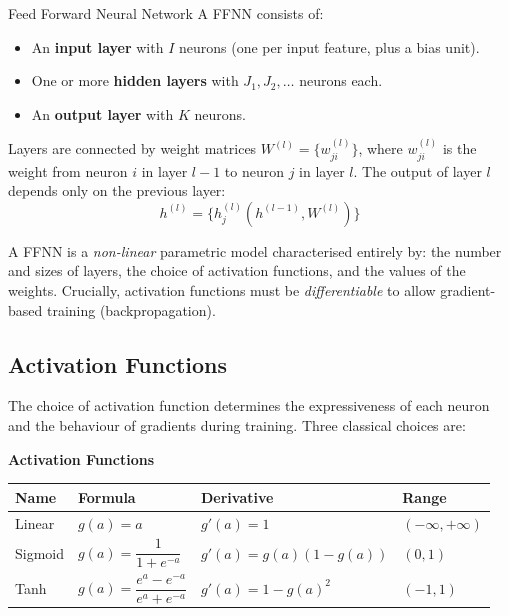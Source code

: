 \documentclass[11pt,a4paper]{article}
\begin{document}
\begin{defbox}{Feed Forward Neural Network}
A FFNN consists of:
\begin{itemize}
  \item An \textbf{input layer} with $I$ neurons (one per input feature, plus a bias unit).
  \item One or more \textbf{hidden layers} with $J_1, J_2, \ldots$ neurons each.
  \item An \textbf{output layer} with $K$ neurons.
\end{itemize}
Layers are connected by weight matrices $W^{(l)} = \{w_{ji}^{(l)}\}$, where $w_{ji}^{(l)}$ is the weight from neuron $i$ in layer $l-1$ to neuron $j$ in layer $l$. The output of layer $l$ depends only on the previous layer:
\[
h^{(l)} = \bigl\{h_j^{(l)}(h^{(l-1)}, W^{(l)})\bigr\}
\]
\end{defbox}

A FFNN is a \emph{non-linear} parametric model characterised entirely by: the number and sizes of layers, the choice of activation functions, and the values of the weights. Crucially, activation functions must be \emph{differentiable} to allow gradient-based training (backpropagation).

\subsection{Activation Functions}

The choice of activation function determines the expressiveness of each neuron and the behaviour of gradients during training. Three classical choices are:

\begin{tcolorbox}[colback=LightBlue,colframe=AccentBlue,boxrule=0.8pt,arc=3pt]
\textbf{Activation Functions}\\[6pt]
\begin{tabular}{@{}llll@{}}
\toprule
\textbf{Name} & \textbf{Formula} & \textbf{Derivative} & \textbf{Range} \\
\midrule
Linear & $g(a) = a$ & $g'(a) = 1$ & $(-\infty, +\infty)$ \\
Sigmoid & $g(a) = \dfrac{1}{1+e^{-a}}$ & $g'(a) = g(a)(1-g(a))$ & $(0, 1)$ \\
Tanh & $g(a) = \dfrac{e^a - e^{-a}}{e^a + e^{-a}}$ & $g'(a) = 1 - g(a)^2$ & $(-1, 1)$ \\
\bottomrule
\end{tabular}
\end{tcolorbox}
\end{document}
